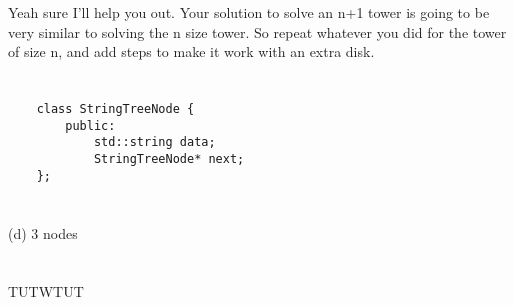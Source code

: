 \documentclass[tikz, a4paper,12pt]{article}
\begin{document}
\section{}
\par {
    Yeah sure I'll help you out.
    Your solution to solve an n+1 tower is going to be very similar to solving the n size tower.
    So repeat whatever you did for the tower of size n, and add steps to make it work with an extra disk.
}

\section{}
\section{}

\section{}
\begin{lstlisting}
    class StringTreeNode {
        public:
            std::string data;
            StringTreeNode* next;
    };
\end{lstlisting}

\section{}
(d) 3 nodes

\section{}
TUTWTUT
\end{document}
